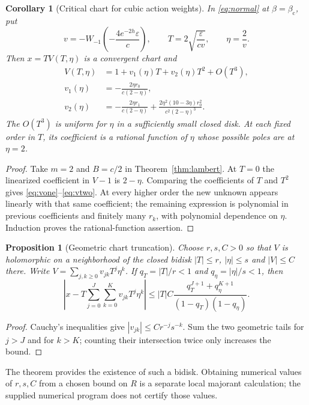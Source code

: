 \documentclass[11pt,a4paper]{article}
\numberwithin{equation}{section}
\newtheorem{proposition}[theorem]{Proposition}
\newtheorem{corollary}[theorem]{Corollary}
\theoremstyle{definition}
\theoremstyle{remark}
\newcommand{\bc}{\beta_{\mathrm c}}
\newcommand{\eps}{\varepsilon}
\begin{document}
\begin{corollary}[Critical chart for cubic action weights]
\label{cor:criticalchart}
In \eqref{eq:normal} at $\beta=\bc$, put
\begin{equation}\label{eq:criticalLambert}
 v=-W_{-1}\left(-\frac{4e^{-2h}\eps}{c}\right),\qquad
 T=2\sqrt{\frac{\eps}{cv}},\qquad \eta=\frac2v.
\end{equation}
Then $x=TV(T,\eta)$ is a convergent chart and
\begin{align}
 V(T,\eta)&=1+v_1(\eta)T+v_2(\eta)T^2+O(T^3),\label{eq:Vexp}\\
 v_1(\eta)&=-\frac{2\eta r_0}{c(2-\eta)},\label{eq:vone}\\
 v_2(\eta)&=-\frac{2\eta r_1}{c(2-\eta)}
 +\frac{2\eta^2(10-3\eta)r_0^2}{c^2(2-\eta)^3}.\label{eq:vtwo}
\end{align}
The $O(T^3)$ is uniform for $\eta$ in a sufficiently small closed disk.
At each fixed order in $T$, its coefficient is a rational function of
$\eta$ whose possible poles are at $\eta=2$.
\end{corollary}
\begin{proof}
Take $m=2$ and $B=c/2$ in Theorem~\ref{thm:lambert}. At $T=0$ the
linearized coefficient in $V-1$ is $2-\eta$. Comparing the coefficients
of $T$ and $T^2$ gives \eqref{eq:vone}--\eqref{eq:vtwo}. At every higher
order the new unknown appears linearly with that same coefficient;
the remaining expression is polynomial in previous coefficients and
finitely many $r_k$, with polynomial dependence on $\eta$. Induction
proves the rational-function assertion.
\end{proof}

\begin{proposition}[Geometric chart truncation]
\label{prop:geometric}
Choose $r,s,C>0$ so that $V$ is holomorphic on a neighborhood of the
closed bidisk $|T|\le r$, $|\eta|\le s$ and $|V|\le C$ there. Write
$V=\sum_{j,k\ge0}v_{jk}T^j\eta^k$. If $q_T=|T|/r<1$ and
$q_\eta=|\eta|/s<1$, then
\begin{equation}\label{eq:geometric}
 \left|x-T\sum_{j=0}^{J}\sum_{k=0}^{K}v_{jk}T^j\eta^k\right|
 \le |T|C\frac{q_T^{J+1}+q_\eta^{K+1}}
 {(1-q_T)(1-q_\eta)}.
\end{equation}
\end{proposition}
\begin{proof}
Cauchy's inequalities give $|v_{jk}|\le Cr^{-j}s^{-k}$. Sum the two
geometric tails for $j>J$ and for $k>K$; counting their intersection
twice only increases the bound.
\end{proof}
The theorem provides the existence of such a bidisk. Obtaining numerical
values of $r,s,C$ from a chosen bound on $R$ is a separate local
majorant calculation; the supplied numerical program does not certify
those values.
\end{document}
